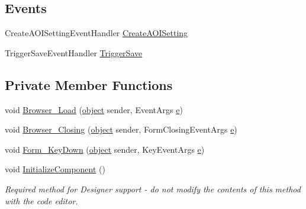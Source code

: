 \subsection*{Events}
\begin{DoxyCompactItemize}
\item 
Create\+A\+O\+I\+Setting\+Event\+Handler \hyperlink{class_web_analyzer_1_1_u_i_1_1_edit_a_o_i_setting_form_a1841845af65ba0e224742710ddefb772}{Create\+A\+O\+I\+Setting}
\item 
Trigger\+Save\+Event\+Handler \hyperlink{class_web_analyzer_1_1_u_i_1_1_edit_a_o_i_setting_form_a5333229783b91948ba94f0ed0a947c6d}{Trigger\+Save}
\end{DoxyCompactItemize}
\subsection*{Private Member Functions}
\begin{DoxyCompactItemize}
\item 
void \hyperlink{class_web_analyzer_1_1_u_i_1_1_edit_a_o_i_setting_form_ab47fff9e8c4851429319cc9fb46c0eb1}{Browser\+\_\+\+Load} (\hyperlink{_u_i_2_h_t_m_l_resources_2js_2lib_2underscore_8min_8js_aae18b7515bb2bc4137586506e7c0c903}{object} sender, Event\+Args \hyperlink{_u_i_2_h_t_m_l_resources_2js_2lib_2bootstrap_8min_8js_ab5902775854a8b8440bcd25e0fe1c120}{e})
\item 
void \hyperlink{class_web_analyzer_1_1_u_i_1_1_edit_a_o_i_setting_form_ae93f58e17512c90018b3e95803e90cd3}{Browser\+\_\+\+Closing} (\hyperlink{_u_i_2_h_t_m_l_resources_2js_2lib_2underscore_8min_8js_aae18b7515bb2bc4137586506e7c0c903}{object} sender, Form\+Closing\+Event\+Args \hyperlink{_u_i_2_h_t_m_l_resources_2js_2lib_2bootstrap_8min_8js_ab5902775854a8b8440bcd25e0fe1c120}{e})
\item 
void \hyperlink{class_web_analyzer_1_1_u_i_1_1_edit_a_o_i_setting_form_a7319ca9688de4712cb96969ece791b79}{Form\+\_\+\+Key\+Down} (\hyperlink{_u_i_2_h_t_m_l_resources_2js_2lib_2underscore_8min_8js_aae18b7515bb2bc4137586506e7c0c903}{object} sender, Key\+Event\+Args \hyperlink{_u_i_2_h_t_m_l_resources_2js_2lib_2bootstrap_8min_8js_ab5902775854a8b8440bcd25e0fe1c120}{e})
\item 
void \hyperlink{class_web_analyzer_1_1_u_i_1_1_edit_a_o_i_setting_form_ada0ce372ca35664f19e52301a3809853}{Initialize\+Component} ()
\begin{DoxyCompactList}\small\item\em Required method for Designer support -\/ do not modify the contents of this method with the code editor. \end{DoxyCompactList}\end{DoxyCompactItemize}
